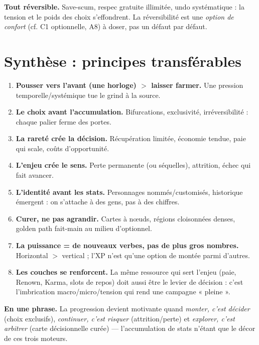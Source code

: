 \documentclass[11pt,a4paper]{article}
\begin{document}
\begin{antipat}
\textbf{Tout réversible.} Save-scum, respec gratuite illimitée, undo systématique : la tension et le poids des choix s'effondrent. La réversibilité est une \emph{option de confort} (cf. C1 optionnelle, A8) à doser, pas un défaut par défaut.
\end{antipat}

\section{Synthèse : principes transférables}

\begin{enumerate}[leftmargin=1.4em]
\item \textbf{Pousser vers l'avant (une horloge) $>$ laisser farmer.} Une pression temporelle/systémique tue le grind à la source.
\item \textbf{Le choix avant l'accumulation.} Bifurcations, exclusivité, irréversibilité : chaque palier ferme des portes.
\item \textbf{La rareté crée la décision.} Récupération limitée, économie tendue, paie qui scale, coûts d'opportunité.
\item \textbf{L'enjeu crée le sens.} Perte permanente (ou séquelles), attrition, échec qui fait avancer.
\item \textbf{L'identité avant les stats.} Personnages nommés/customisés, historique émergent : on s'attache à des gens, pas à des chiffres.
\item \textbf{Curer, ne pas agrandir.} Cartes à nœuds, régions cloisonnées denses, golden path fait-main au milieu d'optionnel.
\item \textbf{La puissance = de nouveaux verbes, pas de plus gros nombres.} Horizontal $>$ vertical ; l'XP n'est qu'une option de montée parmi d'autres.
\item \textbf{Les couches se renforcent.} La même ressource qui sert l'enjeu (paie, Renown, Karma, slots de repos) doit aussi être le levier de décision : c'est l'imbrication macro/micro/tension qui rend une campagne « pleine ».
\end{enumerate}

\begin{principe}
\textbf{En une phrase.} La progression devient motivante quand \emph{monter, c'est décider} (choix exclusifs), \emph{continuer, c'est risquer} (attrition/perte) et \emph{explorer, c'est arbitrer} (carte décisionnelle curée) --- l'accumulation de stats n'étant que le décor de ces trois moteurs.
\end{principe}
\end{document}
